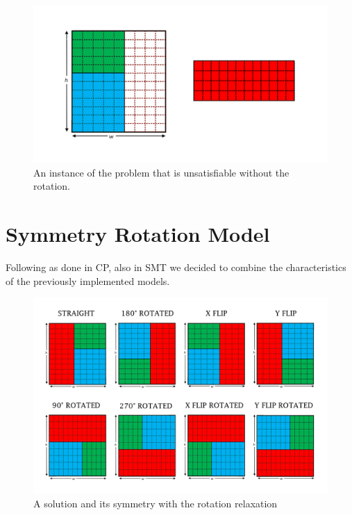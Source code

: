 \begin{figure}[ht]
	\centering
	\includegraphics[width=\textwidth]{images/rotated_problem.png}
	\caption{An instance of the problem that is unsatisfiable without the rotation.}
	\label{fig:overlaps}
\end{figure}



\section{Symmetry Rotation Model}
Following as done in CP, also in SMT we decided to combine the characteristics of the previously implemented models.

\begin{figure}[ht]
	\centering
	\includegraphics[width=\textwidth]{images/rotated_simmetry.png}
	\caption{A solution and its symmetry with the rotation relaxation}
	\label{fig:overlaps}
\end{figure}

